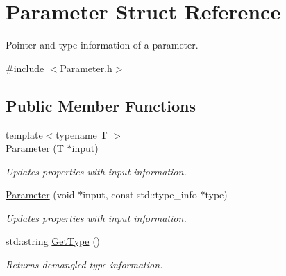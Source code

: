 \hypertarget{structParameter}{\section{Parameter Struct Reference}
\label{structParameter}
}


Pointer and type information of a parameter.  




{\ttfamily \#include $<$Parameter.\-h$>$}

\subsection*{Public Member Functions}
\begin{DoxyCompactItemize}
\item 
{\footnotesize template$<$typename T $>$ }\\\hyperlink{structParameter_a03adc91dc695b308db4e466c3c522afc}{Parameter} (T $\ast$input)
\begin{DoxyCompactList}\small\item\em Updates properties with input information. \end{DoxyCompactList}\item 
\hyperlink{structParameter_a47ca57d7377d16a561aa61eeb660fd40}{Parameter} (void $\ast$input, const std\-::type\-\_\-info $\ast$type)
\begin{DoxyCompactList}\small\item\em Updates properties with input information. \end{DoxyCompactList}\item 
\hypertarget{structParameter_acbaa165bda6b087c2e99fdb8925a7d89}{std\-::string \hyperlink{structParameter_acbaa165bda6b087c2e99fdb8925a7d89}{Get\-Type} ()}\label{structParameter_acbaa165bda6b087c2e99fdb8925a7d89}

\begin{DoxyCompactList}\small\item\em Returns demangled type information. \end{DoxyCompactList}\end{DoxyCompactItemize}
